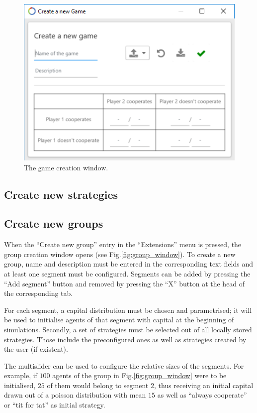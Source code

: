 \documentclass[parskip=full,11pt]{scrartcl}
\begin{document}
\begin{figure}
	\centering
	\includegraphics[width=0.8\linewidth]{img_manual/game_window.png}
	\caption{The game creation window.}
	\label{fig:game_window}
\end{figure}

\subsection{Create new strategies}

\subsection{Create new groups}
When the \enquote{Create new group} entry in the \enquote{Extensions} menu is pressed, the group creation window opens (see Fig.\ref{fig:group_window}). To create a new group, name and description must be entered in the corresponding text fields and at least one segment must be configured. Segments can be added by pressing the \enquote{Add segment} button and removed by pressing the \enquote{X} button at the head of the corresponding tab.

For each segment, a capital distribution must be chosen and parametrised; it will be used to initialise agents of that segment with capital at the beginning of simulations. Secondly, a set of strategies must be selected out of all locally stored strategies. Those include the preconfigured ones as well as strategies created by the user (if existent).

The multislider can be used to configure the relative sizes of the segments. For example, if \(100\) agents of the group in Fig.\ref{fig:group_window} were to be initialised, \(25\) of them would belong to segment 2, thus receiving an initial capital drawn out of a poisson distribution with mean \(15\) as well as \enquote{always cooperate} or \enquote{tit for tat} as initial strategy.
\end{document}
